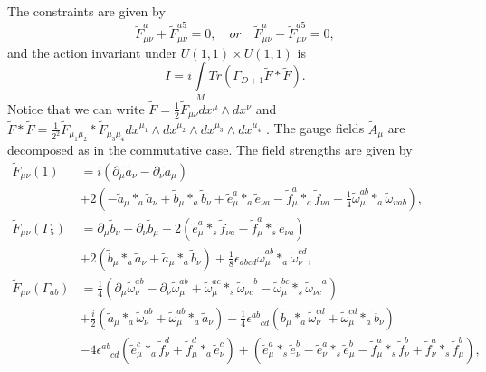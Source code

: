 \documentclass[a4paper,a4paper]{article}
\begin{document}
The constraints are given by
\[
\widetilde{F}_{\mu\nu}^{a}+\widetilde{F}_{\mu\nu}^{a5}=0,\quad or\quad
\widetilde{F}_{\mu\nu}^{a}-\widetilde{F}_{\mu\nu}^{a5}=0,
\]
and the action invariant under $U(1,1)\times U(1,1)$ is
\[
I=i\int\limits_{M}Tr\left(  \Gamma_{D+1}\widetilde{F}\ast\widetilde{F}\right)
.
\]
Notice that we can write $\widetilde{F}=\frac{1}{2}\widetilde{F}_{\mu\nu
}dx^{\mu}\wedge dx^{\nu}$ and $\widetilde{F}\ast\widetilde{F}=\frac{1}{2^{2}%
}\widetilde{F}_{\mu_{1}\mu_{2}}\ast\widetilde{F}_{\mu_{3}\mu_{4}}dx^{\mu_{1}%
}\wedge dx^{\mu_{2}}\wedge dx^{\mu_{3}}\wedge dx^{\mu_{4}}$ $.$ The gauge
fields $\widetilde{A}_{\mu}$ are decomposed as in the commutative case. The
field strengths are given by
\begin{align}
\widetilde{F}_{\mu\nu}\left(  1\right)   &  =i\left(  \partial_{\mu}%
\widetilde{a}_{\nu}-\partial_{\nu}\widetilde{a}_{\mu}\right) \nonumber\\
&  +2\left(  -\widetilde{a}_{\mu}\ast_{a}\widetilde{a}_{\nu}+\widetilde
{b}_{\mu}\ast_{a}\widetilde{b}_{\nu}+\widetilde{e}_{\mu}^{a}\ast_{a}%
\widetilde{e}_{\nu a}-\widetilde{f}_{\mu}^{a}\ast_{a}\widetilde{f}_{\nu
a}-\frac{1}{4}\widetilde{\omega}_{\mu}^{ab}\ast_{a}\widetilde{\omega
}_{\upsilon ab}\right)  ,\nonumber\\
\widetilde{F}_{\mu\nu}\left(  \Gamma_{5}\right)   &  =\partial_{\mu}%
\widetilde{b}_{\nu}-\partial_{\nu}\widetilde{b}_{\mu}+2\left(  \widetilde
{e}_{\mu}^{a}\ast_{s}\widetilde{f}_{\nu a}-\widetilde{f}_{\mu}^{a}\ast
_{s}\widetilde{e}_{\nu a}\right) \nonumber\\
&  +2\left(  \widetilde{b}_{\mu}\ast_{a}\widetilde{a}_{\nu}+\widetilde{a}%
_{\mu}\ast_{a}\widetilde{b}_{\nu}\right)  +\frac{1}{8}\epsilon_{abcd}%
\widetilde{\omega}_{\mu}^{ab}\ast_{a}\widetilde{\omega}_{\nu}^{cd},\nonumber\\
\widetilde{F}_{\mu\nu}\left(  \Gamma_{ab}\right)   &  =\frac{1}{4}\left(
\partial_{\mu}\widetilde{\omega}_{\nu}^{ab}-\partial_{\nu}\widetilde{\omega
}_{\mu}^{ab}+\widetilde{\omega}_{\mu}^{ac}\ast_{s}\widetilde{\omega}_{\nu
c}^{\quad b}-\widetilde{\omega}_{\mu}^{bc}\ast_{s}\widetilde{\omega}_{\nu
c}^{\quad a}\right) \nonumber\\
&  +\frac{i}{2}\left(  \widetilde{a}_{\mu}\ast_{a}\widetilde{\omega}_{\nu
}^{ab}+\widetilde{\omega}_{\mu}^{ab}\ast_{a}\widetilde{a}_{\nu}\right)
-\frac{1}{4}\epsilon_{\quad cd}^{ab}\left(  \widetilde{b}_{\mu}\ast
_{a}\widetilde{\omega}_{\nu}^{cd}+\widetilde{\omega}_{\mu}^{cd}\ast
_{a}\widetilde{b}_{\nu}\right) \nonumber\\
&  -4\epsilon_{\quad cd}^{ab}\left(  \widetilde{e}_{\mu}^{c}\ast_{a}%
\widetilde{f}_{\nu}^{d}+\widetilde{f}_{\mu}^{d}\ast_{a}\widetilde{e}_{\nu}%
^{c}\right)  +\left(  \widetilde{e}_{\mu}^{a}\ast_{s}\widetilde{e}_{\nu}%
^{b}-\widetilde{e}_{\nu}^{a}\ast_{s}\widetilde{e}_{\mu}^{b}-\widetilde{f}%
_{\mu}^{a}\ast_{s}\widetilde{f}_{\nu}^{b}+\widetilde{f}_{\nu}^{a}\ast
_{s}\widetilde{f}_{\mu}^{b}\right)  ,\nonumber
\end{align}
\end{document}
